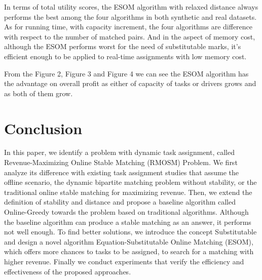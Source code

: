 \documentclass[color,twoside,amssymb,twocolumn]{article}
\begin{document}

In terms of total utility scores, the ESOM algorithm with relaxed distance always performs the best among the four algorithms in both synthetic and real datasets. As for running time, with capacity increment, the four algorithms are difference with respect to the number of matched pairs. And in the aspect of memory cost, although the ESOM performs worst for the need of substitutable marks, it's efficient enough to be applied to real-time assignments with low memory cost.

From the Figure 2, Figure 3 and Figure 4 we can see the ESOM algorithm has the advantage on overall profit as either of capacity of tasks or drivers grows and as both of them grow.

\section{Conclusion}

In this paper, we identify a problem with dynamic task assignment, called Revenue-Maximizing Online Stable Matching (RMOSM) Problem. We first analyze its difference with existing task assignment studies that assume the offline scenario, the dynamic bipartite matching problem without stability, or the traditional online stable matching for maximizing revenue. Then, we extend the definition of stability and distance and propose a baseline algorithm called Online-Greedy towards the problem based on traditional algorithms. Although the baseline algorithm can produce a stable matching as an answer, it performs not well enough. To find better solutions, we introduce the concept Substitutable and design a novel algorithm Equation-Substitutable Online Matching (ESOM), which offers more chances to tasks to be assigned, to search for a matching with higher revenue. Finally we conduct experiments that verify the efficiency and effectiveness of the proposed approaches.



\end{document}

